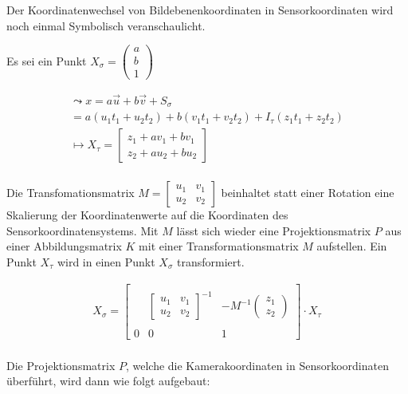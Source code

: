 		Der Koordinatenwechsel von Bildebenenkoordinaten in Sensorkoordinaten wird noch einmal Symbolisch veranschaulicht.	 
		
		Es sei ein Punkt $X_\sigma=\begin{pmatrix}
		a\\b\\1
		\end{pmatrix}$
		
		\begin{gather}
		\leadsto x = a \vec{u} + b \vec{v} + S_\sigma\\
		= a (u_1 t_1 + u_2 t_2) +b(v_1 t_1 + v_2 t_2) + I_\tau(z_1 t_1+z_2 t_2)\\
		\mapsto X_\tau = \begin{bmatrix}
		z_1 + a v_1 + b v_1\\
		z_2 + a u_2 + b u_2
		\end{bmatrix}\\
	\end{gather}

Die Transfomationsmatrix $M = \begin{bmatrix}
	u_1& v_1\\
	u_2& v_2
\end{bmatrix}$ beinhaltet statt einer Rotation eine Skalierung der Koordinatenwerte auf die Koordinaten des Sensorkoordinatensystems. Mit $M$ lässt sich wieder eine Projektionsmatrix $P$ aus einer Abbildungsmatrix $K$ mit einer Transformationsmatrix $M$ aufstellen. Ein Punkt $X_\tau$ wird in einen Punkt $X_\sigma$ transformiert.
	
		\begin{gather}
		X_\sigma =
		\begin{bmatrix}
		&  & \\
		&\begin{bmatrix}
		u_1& v_1\\
		u_2& v_2
		\end{bmatrix}^{-1}  & -M^{-1}\begin{pmatrix}
		z_1\\z_2
		\end{pmatrix} \\ 
		&  & \\
		0&0 & 1
		\end{bmatrix}
		\cdot
		X_\tau	
		\end{gather}\\
		
		 Die Projektionsmatrix $P$, welche die Kamerakoordinaten in Sensorkoordinaten überführt, wird dann wie folgt aufgebaut:\\
		
